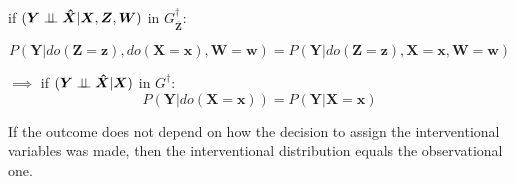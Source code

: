 \documentclass[11pt,a4paper]{article}
\begin{document}
if $(\boldsymbol{Y} \perp\!\!\!\perp \boldsymbol{\hat{X}}|\boldsymbol{X},\boldsymbol{Z},\boldsymbol{W})$ in $G^{\dagger}_{\boldsymbol{\overline{Z}}}$:

\begin{equation}
\label{eq:Do2}
P(\boldsymbol{Y}|do(\boldsymbol{Z}=\boldsymbol{z}),do(\boldsymbol{X}=\boldsymbol{x}),\boldsymbol{W}=\boldsymbol{w}) = P(\boldsymbol{Y}|do(\boldsymbol{Z}=\boldsymbol{z}),\boldsymbol{X}=\boldsymbol{x},\boldsymbol{W}=\boldsymbol{w})
\end{equation}

$\implies$ if  $(\boldsymbol{Y} \perp\!\!\!\perp \boldsymbol{\hat{X}}|\boldsymbol{X})$ in $G^{\dagger}$:
\begin{equation}
\label{eq:Do22}
P(\boldsymbol{Y}|do(\boldsymbol{X}=\boldsymbol{x})) = P(\boldsymbol{Y}|\boldsymbol{X}=\boldsymbol{x})
\end{equation}

If the outcome does not depend on how the decision to assign the interventional variables was made, then the interventional distribution equals the observational one. 
\end{document}
